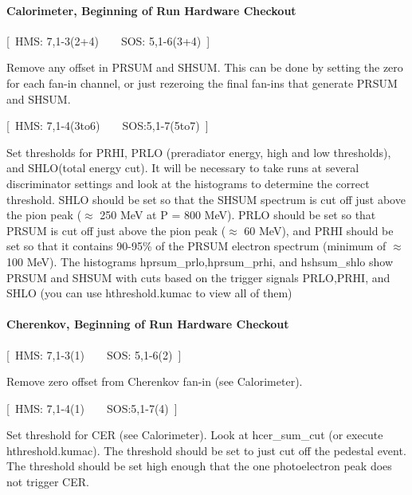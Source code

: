 \paragraph{Calorimeter, Beginning of Run Hardware Checkout}

\begin{description}
\item{[~HMS: 7,1-3(2+4)~~~~SOS: 5,1-6(3+4)~]}
\end{description}

Remove any offset in PRSUM and SHSUM. This can be done by setting
the zero for each fan-in channel, or just rezeroing the final fan-ins that
generate PRSUM and SHSUM.

\begin{description}
\item{[~HMS: 7,1-4(3to6)~~~~SOS:5,1-7(5to7)~]}
\end{description}

Set thresholds for PRHI, PRLO (preradiator energy, high and low
thresholds), and SHLO(total energy cut). It will be necessary to take
runs at several discriminator settings and look at the histograms to determine
the correct threshold. SHLO should be set so that the SHSUM spectrum is
cut off just above the pion peak ($\approx$ 250 MeV at P = 800 MeV).
PRLO should be set so that PRSUM is cut off just above the pion peak
($\approx$ 60 MeV), and PRHI should be set so that it contains 90-95\%
of the PRSUM electron spectrum (minimum of $\approx$ 100 MeV).
The histograms hprsum\_prlo,hprsum\_prhi, and hshsum\_shlo show PRSUM
and SHSUM with cuts based on the trigger signals PRLO,PRHI, and SHLO (you can
use hthreshold.kumac to view all of them)

\paragraph{Cherenkov, Beginning of Run Hardware Checkout}

\begin{description}
\item{[~HMS: 7,1-3(1)~~~~SOS: 5,1-6(2)~]}
\end{description}

Remove zero offset from Cherenkov fan-in (see Calorimeter).

\begin{description}
\item{[~HMS: 7,1-4(1)~~~~SOS:5,1-7(4)~]}
\end{description}

Set threshold for CER (see Calorimeter). Look at hcer\_sum\_cut (or
execute hthreshold.kumac). The threshold should be set to just cut off the
pedestal event. The threshold should be set high enough that the one
photoelectron peak does not trigger CER.

